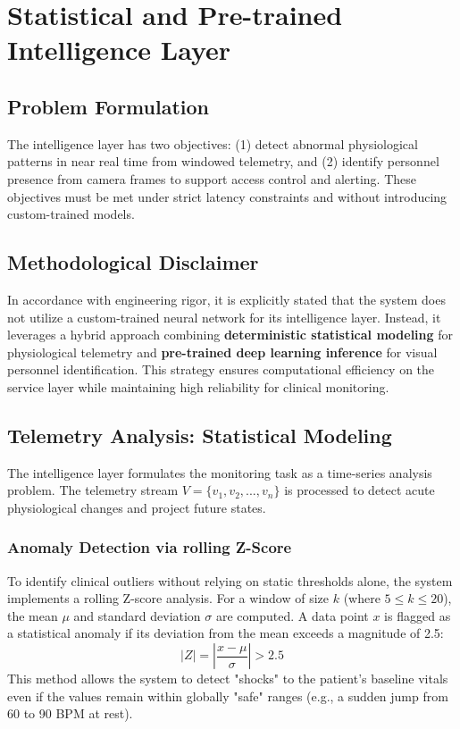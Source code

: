 \chapter{Statistical and Pre-trained Intelligence Layer}
\label{ch:intelligence}

\section{Problem Formulation}
The intelligence layer has two objectives: (1) detect abnormal physiological patterns in near real time from windowed telemetry, and (2) identify personnel presence from camera frames to support access control and alerting. These objectives must be met under strict latency constraints and without introducing custom-trained models.

\section{Methodological Disclaimer}
In accordance with engineering rigor, it is explicitly stated that the system does not utilize a custom-trained neural network for its intelligence layer. Instead, it leverages a hybrid approach combining \textbf{deterministic statistical modeling} for physiological telemetry and \textbf{pre-trained deep learning inference} for visual personnel identification. This strategy ensures computational efficiency on the service layer while maintaining high reliability for clinical monitoring.

\section{Telemetry Analysis: Statistical Modeling}
The intelligence layer formulates the monitoring task as a time-series analysis problem. The telemetry stream $V = \{v_1, v_2, ..., v_n\}$ is processed to detect acute physiological changes and project future states.

\subsection{Anomaly Detection via rolling Z-Score}
To identify clinical outliers without relying on static thresholds alone, the system implements a rolling Z-score analysis. For a window of size $k$ (where $5 \leq k \leq 20$), the mean $\mu$ and standard deviation $\sigma$ are computed. A data point $x$ is flagged as a statistical anomaly if its deviation from the mean exceeds a magnitude of 2.5:
\begin{equation}
    |Z| = \left| \frac{x - \mu}{\sigma} \right| > 2.5
    \label{eq:z_score_intel}
\end{equation}
This method allows the system to detect "shocks" to the patient's baseline vitals even if the values remain within globally "safe" ranges (e.g., a sudden jump from 60 to 90 BPM at rest).

